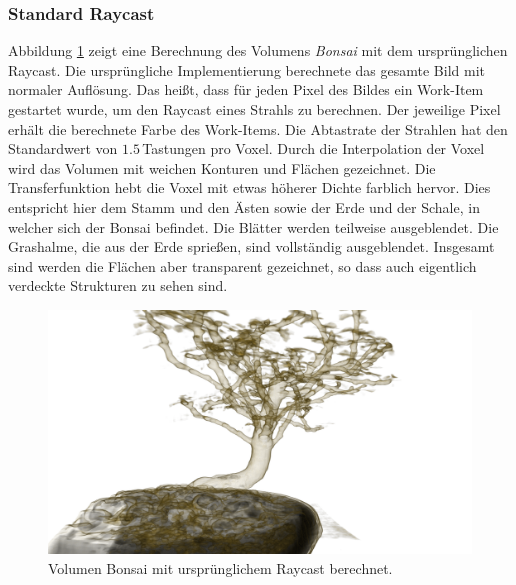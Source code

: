 \subsubsection{Standard Raycast}\label{ss::res::sr}
Abbildung \ref{fig::res::bon_st} zeigt eine Berechnung des Volumens \emph{Bonsai} mit dem ursprünglichen Raycast.
Die ursprüngliche Implementierung berechnete das gesamte Bild mit normaler Auflösung.
Das heißt, dass für jeden Pixel des Bildes ein Work-Item gestartet wurde, um den Raycast eines Strahls zu berechnen.
Der jeweilige Pixel erhält die berechnete Farbe des Work-Items.
Die Abtastrate der Strahlen hat den Standardwert von $1.5$\,Tastungen pro Voxel.
Durch die Interpolation der Voxel wird das Volumen mit weichen Konturen und Flächen gezeichnet.
Die Transferfunktion hebt die Voxel mit etwas höherer Dichte farblich hervor.
Dies entspricht hier dem Stamm und den Ästen sowie der Erde und der Schale, in welcher sich der Bonsai befindet.
Die Blätter werden teilweise ausgeblendet.
Die Grashalme, die aus der Erde sprießen, sind vollständig ausgeblendet.
Insgesamt sind werden die Flächen aber transparent gezeichnet, so dass auch eigentlich verdeckte Strukturen zu sehen sind.

\begin{landscape}
	\begin{figure}
		\centering
		\includegraphics[width=\textheight]{../../Grafiken/results/picture_quality/bonsai/Standard_img-1_Ray-1-5.png}
		\caption{Volumen Bonsai mit ursprünglichem Raycast berechnet.}
		\label{fig::res::bon_st}
	\end{figure}
\end{landscape}

